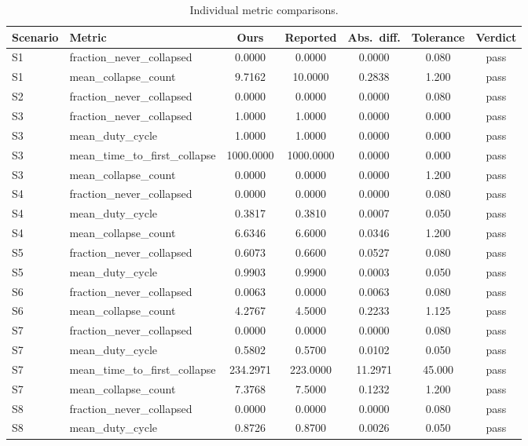 \documentclass[11pt]{article}
\newcommand{\pass}{\textcolor{green!55!black}{pass}}
\begin{document}
\begin{table}[ht]
\centering
\caption{Individual metric comparisons.}
\scriptsize
\begin{tabular}{llccccc}
\toprule
Scenario & Metric & Ours & Reported & Abs.\ diff. & Tolerance & Verdict \\
\midrule
S1 & fraction\_never\_collapsed & 0.0000 & 0.0000 & 0.0000 & 0.080 & \pass \\
S1 & mean\_collapse\_count & 9.7162 & 10.0000 & 0.2838 & 1.200 & \pass \\
S2 & fraction\_never\_collapsed & 0.0000 & 0.0000 & 0.0000 & 0.080 & \pass \\
S3 & fraction\_never\_collapsed & 1.0000 & 1.0000 & 0.0000 & 0.000 & \pass \\
S3 & mean\_duty\_cycle & 1.0000 & 1.0000 & 0.0000 & 0.000 & \pass \\
S3 & mean\_time\_to\_first\_collapse & 1000.0000 & 1000.0000 & 0.0000 & 0.000 & \pass \\
S3 & mean\_collapse\_count & 0.0000 & 0.0000 & 0.0000 & 1.200 & \pass \\
S4 & fraction\_never\_collapsed & 0.0000 & 0.0000 & 0.0000 & 0.080 & \pass \\
S4 & mean\_duty\_cycle & 0.3817 & 0.3810 & 0.0007 & 0.050 & \pass \\
S4 & mean\_collapse\_count & 6.6346 & 6.6000 & 0.0346 & 1.200 & \pass \\
S5 & fraction\_never\_collapsed & 0.6073 & 0.6600 & 0.0527 & 0.080 & \pass \\
S5 & mean\_duty\_cycle & 0.9903 & 0.9900 & 0.0003 & 0.050 & \pass \\
S6 & fraction\_never\_collapsed & 0.0063 & 0.0000 & 0.0063 & 0.080 & \pass \\
S6 & mean\_collapse\_count & 4.2767 & 4.5000 & 0.2233 & 1.125 & \pass \\
S7 & fraction\_never\_collapsed & 0.0000 & 0.0000 & 0.0000 & 0.080 & \pass \\
S7 & mean\_duty\_cycle & 0.5802 & 0.5700 & 0.0102 & 0.050 & \pass \\
S7 & mean\_time\_to\_first\_collapse & 234.2971 & 223.0000 & 11.2971 & 45.000 & \pass \\
S7 & mean\_collapse\_count & 7.3768 & 7.5000 & 0.1232 & 1.200 & \pass \\
S8 & fraction\_never\_collapsed & 0.0000 & 0.0000 & 0.0000 & 0.080 & \pass \\
S8 & mean\_duty\_cycle & 0.8726 & 0.8700 & 0.0026 & 0.050 & \pass \\

\end{tabular}
\end{table}
\end{document}
